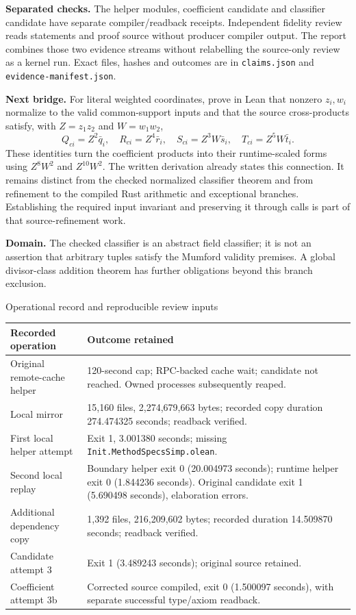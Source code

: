 \documentclass[11pt]{article}
\begin{document}
\textbf{Separated checks.} The helper modules, coefficient candidate and classifier candidate have separate compiler/readback receipts. Independent fidelity review reads statements and proof source without producer compiler output. The report combines those two evidence streams without relabelling the source-only review as a kernel run. Exact files, hashes and outcomes are in \texttt{claims.json} and \texttt{evidence-manifest.json}.

\textbf{Next bridge.} For literal weighted coordinates, prove in Lean that nonzero $z_i,w_i$ normalize to the valid common-support inputs and that the source cross-products satisfy, with $Z=z_1z_2$ and $W=w_1w_2$,
\[
Q_{ci}=Z^2\bar q_i,\quad R_{ci}=Z^4\bar r_i,\quad
S_{ci}=Z^3W\bar s_i,\quad T_{ci}=Z^5W\bar t_i.
\]
These identities turn the coefficient products into their runtime-scaled forms using $Z^8W^2$ and $Z^{10}W^2$. The written derivation already states this connection. It remains distinct from the checked normalized classifier theorem and from refinement to the compiled Rust arithmetic and exceptional branches. Establishing the required input invariant and preserving it through calls is part of that source-refinement work.

\textbf{Domain.} The checked classifier is an abstract field classifier; it is not an assertion that arbitrary tuples satisfy the Mumford validity premises. A global divisor-class addition theorem has further obligations beyond this branch exclusion.

\newpage
{\Large Operational record and reproducible review inputs}

\begin{tabularx}{\textwidth}{@{}p{}X@{}}\toprule
Recorded operation & Outcome retained\\\midrule
Original remote-cache helper & 120-second cap; RPC-backed cache wait; candidate not reached. Owned processes subsequently reaped.\\
Local mirror & 15,160 files, 2,274,679,663 bytes; recorded copy duration 274.474325 seconds; readback verified.\\
First local helper attempt & Exit 1, 3.001380 seconds; missing \texttt{Init.MethodSpecsSimp.olean}.\\
Second local replay & Boundary helper exit 0 (20.004973 seconds); runtime helper exit 0 (1.844236 seconds). Original candidate exit 1 (5.690498 seconds), elaboration errors.\\
Additional dependency copy & 1,392 files, 216,209,602 bytes; recorded duration 14.509870 seconds; readback verified.\\
Candidate attempt 3 & Exit 1 (3.489243 seconds); original source retained.\\
Coefficient attempt 3b & Corrected source compiled, exit 0 (1.500097 seconds), with separate successful type/axiom readback.\\\bottomrule
\end{tabularx}
\end{document}
